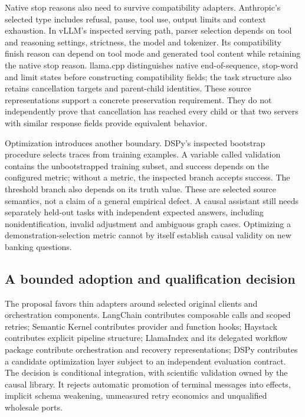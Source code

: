Native stop reasons also need to survive compatibility adapters. Anthropic's selected type includes
refusal, pause, tool use, output limits and context exhaustion. In vLLM's inspected serving path,
parser selection depends on tool and reasoning settings, strictness, the model and tokenizer.
Its compatibility finish reason can depend on tool mode and generated tool content while retaining
the native stop reason. llama.cpp distinguishes native end-of-sequence, stop-word and limit states
before constructing compatibility fields; the task structure also retains cancellation targets and
parent-child identities. These source representations support a concrete preservation requirement.
They do not independently prove that cancellation has reached every child or that two servers with
similar response fields provide equivalent behavior.\citep{exec28_dl_anthropic,exec28_dl_vllm,exec28_dl_llamacpp}

Optimization introduces another boundary. DSPy's inspected bootstrap procedure selects traces from
training examples. A variable called validation contains the unbootstrapped training subset, and
success depends on the configured metric; without a metric, the inspected branch accepts success.
The threshold branch also depends on its truth value. These are selected source semantics, not a
claim of a general empirical defect. A causal assistant still needs separately held-out tasks with
independent expected answers, including nonidentification, invalid adjustment and ambiguous graph
cases. Optimizing a demonstration-selection metric cannot by itself establish causal validity on
new banking questions.\citep{exec28_dl_dspy}

\subsection{A bounded adoption and qualification decision}
The proposal favors thin adapters around selected original clients and orchestration components.
LangChain contributes composable calls and scoped retries; Semantic Kernel contributes provider and
function hooks; Haystack contributes explicit pipeline structure; LlamaIndex and its delegated
workflow package contribute orchestration and recovery representations; DSPy contributes a candidate
optimization layer subject to an independent evaluation contract. The decision is conditional
integration, with scientific validation owned by the causal library. It rejects automatic promotion
of terminal messages into effects, implicit schema weakening, unmeasured retry economics and
unqualified wholesale ports.\citep{exec28_dl_langchain,exec28_dl_semantic_kernel,exec28_dl_haystack,exec28_dl_llama_index,exec28_dl_workflows,exec28_dl_dspy}


